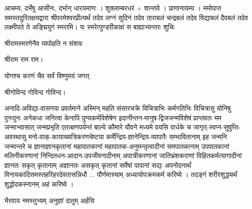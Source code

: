 


आचम्य, दर्भेषु आसीनः, दर्भान् धारयमाणः । शुक्लाम्बरधरं + शान्तये । प्राणानायम्य । 
    ममोपात्त समस्तदुरितक्षयद्वारा श्रीपरमेश्वरप्रीत्यर्थं   तदेव लग्नं सुदिनं तदेव ताराबलं चन्द्रबलं तदेव विद्याबलं दैवबलं तदेव लक्ष्मीपते ते अङ्घ्रियुगं स्मरामि।
    {यः स्मरेत्पुण्डरीकाक्षं स बाह्याभ्यन्तरः शुचिः}

{श्रीरामस्मरणेनैव व्यपोहति न संशयः }

श्रीराम राम राम। 

{योगश्च करणं चैव सर्वं विष्णुमयं जगत्}

श्रीगोविन्द गोविन्द गोविन्द। 

    अनादि-अविद्या-वासनया प्रवर्तमाने अस्मिन् महति संसारचक्रे विचित्राभिः कर्मगतिभिः विचित्रासु योनिषु पुनःपुनः अनेकधा जनित्वा केनापि पुण्यकर्मविशेषेण इदानीन्तन-मानुष-द्विजजन्मविशेषं प्राप्तवतः मम जन्माभ्यासात् जन्मप्रभृति एतत्क्षणपर्यन्तं बाल्ये कौमारे यौवने मध्यमे वयसि वार्धके च जागृत्-स्वप्न-सुषुप्ति-अवस्थासु मनो-वाक्-कायाख्यत्रिकरणचेष्टया कर्मेन्द्रिय-ज्ञानेन्द्रिय-व्यापारैः सम्भावितानाम् इह जन्मनि जन्मान्तरे च ज्ञानाज्ञानकृतानां महापातकानां महापातक-अनुमन्तृत्वादीनां समपातकानाम् उपपातकानां मलिनीकरणानां निन्दितधन-आदान-उपजीवनादीनाम् अपात्रीकरणानां जातिभ्रंशकराणां विहितकर्मत्यागादीनां ज्ञानतः सकृत् कृतानाम् अज्ञानतः असकृत् कृतानां सर्वेषां पापानां सद्यः अपनोदनार्थं  
    विनायकादिसमस्तहरिहरदेवतासन्निधौ ... पौर्णमास्याम् अध्यायोपक्रमकर्म करिष्ये । 
    तदङ्गं शरीरशुद्ध्यर्थं शुद्धोदकस्नानम् अहं करिष्ये ।
    
     {भैरवाय नमस्तुभ्यम् अनुज्ञां दातुम् अर्हसि}

    




